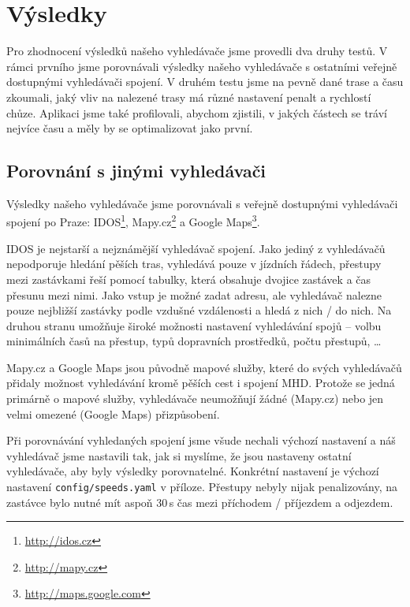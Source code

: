 \chapter{Výsledky}
Pro zhodnocení výsledků našeho vyhledávače jsme provedli dva druhy testů. V
rámci prvního jsme porovnávali výsledky našeho vyhledávače s ostatními veřejně
dostupnými vyhledávači spojení. V druhém testu jsme na pevně dané trase a času
zkoumali, jaký vliv na nalezené trasy má různé nastavení penalt a rychlostí
chůze. Aplikaci jsme také profilovali, abychom zjistili, v jakých částech se
tráví nejvíce času a měly by se optimalizovat jako první.

\section{Porovnání s jinými vyhledávači}
Výsledky našeho vyhledávače jsme porovnávali s veřejně dostupnými vyhledávači
spojení po Praze: IDOS\footnote{\url{http://idos.cz}},
Mapy.cz\footnote{\url{http://mapy.cz}} a Google
Maps\footnote{\url{http://maps.google.com}}. 

IDOS je nejstarší a nejznámější vyhledávač spojení. Jako jediný z vyhledávačů
nepodporuje hledání pěších tras, vyhledává pouze v jízdních řádech, přestupy
mezi zastávkami řeší pomocí tabulky, která obsahuje dvojice zastávek a čas
přesunu mezi nimi. Jako vstup je možné zadat adresu, ale vyhledávač nalezne
pouze nejbližší zastávky podle vzdušné vzdálenosti a hledá z nich / do nich. 
Na druhou stranu umožňuje široké možnosti nastavení vyhledávání spojů -- volbu
minimálních časů na přestup, typů dopravních prostředků, počtu přestupů, \dots

Mapy.cz a Google Maps jsou původně mapové služby, které do svých vyhledávačů
přidaly možnost vyhledávání kromě pěších cest i spojení MHD. Protože se jedná
primárně o mapové služby, vyhledávače neumožňují žádné (Mapy.cz) nebo jen velmi
omezené (Google Maps) přizpůsobení. 

Při porovnávání vyhledaných spojení jsme všude nechali výchozí nastavení a náš
vyhledávač jsme nastavili tak, jak si myslíme, že jsou nastaveny ostatní
vyhledávače, aby byly výsledky porovnatelné. Konkrétní nastavení je výchozí
nastavení {\tt config/speeds.yaml} v příloze. Přestupy nebyly nijak
penalizovány, na zastávce bylo nutné mít aspoň 30\,s čas mezi příchodem /
příjezdem a odjezdem.

